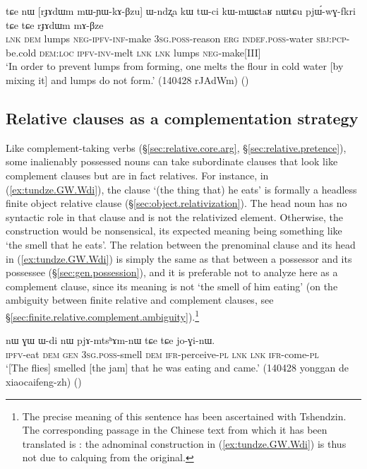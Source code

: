 \begin{exe}
\ex  \label{ex:mWYWkABzu.Wndzxa}
\gll tɕe nɯ [rɟɤdɯm mɯ-ɲɯ-kɤ-βzu] ɯ-ndʐa kɯ tɯ-ci kɯ-mɯɕtaʁ nɯtɕu pjɯ́-wɣ-fkri tɕe tɕe rɟɤdɯm mɤ-βze \\
\textsc{lnk} \textsc{dem} lumps  \textsc{neg}-\textsc{ipfv}-\textsc{inf}-make \textsc{3sg}.\textsc{poss}-reason \textsc{erg} \textsc{indef}.\textsc{poss}-water \textsc{sbj}:\textsc{pcp}-be.cold \textsc{dem}:\textsc{loc} \textsc{ipfv}-\textsc{inv}-melt \textsc{lnk} \textsc{lnk} lumps \textsc{neg}-make[III] \\
\glt `In order to prevent lumps from forming, one melts the flour in cold water [by mixing it] and lumps do not form.' (140428 rJAdWm)
()
\end{exe} 

\subsection{Relative clauses as a complementation strategy} \label{sec:relative.clause.compl.strategy}
Like complement-taking verbs (§\ref{sec:relative.core.arg}, §\ref{sec:relative.pretence}), some inalienably possessed nouns can take subordinate clauses that look like complement clauses but are in fact relatives. For instance, in (\ref{ex:tundze.GW.Wdi}), the clause  `(the thing that) he eats' is formally a headless finite object relative clause (§\ref{sec:object.relativization}). The head noun  has no syntactic role in that clause and is not the relativized element. Otherwise, the construction would be nonsensical, its expected meaning being something like `the smell that he eats'. The relation between the prenominal clause and its head in (\ref{ex:tundze.GW.Wdi}) is simply the same as that between a possessor and its possessee (§\ref{sec:gen.possession}), and it is preferable not to analyze here  as a complement clause, since its meaning is not `the smell of him eating' (on the ambiguity between finite relative and complement clauses, see §\ref{sec:finite.relative.complement.ambiguity}).\footnote{The precise meaning of this sentence has been ascertained with Tshendzin. The corresponding passage in the Chinese text from which it has been translated is : the adnominal construction in (\ref{ex:tundze.GW.Wdi}) is thus not due to calquing from the original. }

\begin{exe}
\ex  \label{ex:tundze.GW.Wdi}
\gll [tu-ndze] nɯ ɣɯ ɯ-di nɯ pjɤ-mtsʰɤm-nɯ tɕe tɕe jo-ɣi-nɯ. \\
\textsc{ipfv}-eat \textsc{dem} \textsc{gen} \textsc{3sg}.\textsc{poss}-smell \textsc{dem} \textsc{ifr}-perceive-\textsc{pl} \textsc{lnk} \textsc{lnk} \textsc{ifr}-come-\textsc{pl} \\
\glt `[The flies] smelled [the jam] that he was eating and came.' (140428 yonggan de xiaocaifeng-zh)
()
\end{exe}

